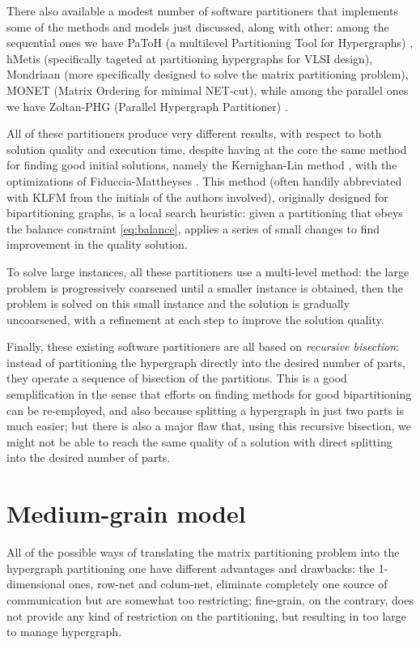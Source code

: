 There also available a modest number of software partitioners that implements some of the methods and models just discussed, along with other: among the sequential ones we have PaToH (a multilevel Partitioning Tool for Hypergraphs) \cite{patoh}, hMetis \cite{hmetis} (specifically tageted at partitioning hypergraphs for VLSI design), Mondriaan \cite{mondriaan} (more specifically designed to solve the matrix partitioning problem), MONET (Matrix Ordering for minimal NET-cut)\cite{hu2000}, while among the parallel ones we have Zoltan-PHG (Parallel Hypergraph Partitioner) \cite{parallel_hypergraph}.

All of these partitioners produce very different results, with respect to both solution quality and execution time, despite having at the core the same method for finding good initial solutions, namely the Kernighan-Lin method \cite{kernighan_lin}, with the optimizations of Fiduccia-Mattheyses \cite{fiduccia}. This method (often handily abbreviated with KLFM from the initials of the authors involved), originally designed for bipartitioning graphs, is a local search heuristic: given a partitioning that obeys the balance constraint \eqref{eq:balance}, applies a series of small changes to find improvement in the quality solution.

To solve large instances, all these partitioners use a multi-level method: the large problem is progressively coarsened until a smaller instance is obtained, then the problem is solved on this small instance and the solution is gradually uncoarsened, with a refinement at each step to improve the solution quality.

Finally, these existing software partitioners are all based on \emph{recursive bisection}: instead of partitioning the hypergraph directly into the desired number of parts, they operate a sequence of bisection of the partitions. This is a good semplification in the sense that efforts on finding methods for good bipartitioning can be re-employed, and also because splitting a hypergraph in just two parts is much easier; but there is also a major flaw that, using this recursive bisection, we might not be able to reach the same quality of a solution with direct splitting into the desired number of parts.

\section{Medium-grain model} \label{sec:mediumgrain}

All of the possible ways of translating the matrix partitioning problem into the hypergraph partitioning one have different advantages and drawbacks: the 1-dimensional ones, row-net and colum-net, eliminate completely one source of communication but are somewhat too restricting; fine-grain, on the contrary, does not provide any kind of restriction on the partitioning, but resulting in too large to manage hypergraph.

